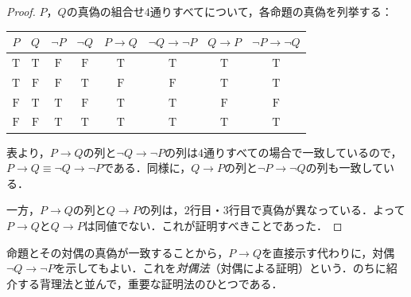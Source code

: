 \begin{tleftbar}
  \begin{proof}
    $P$，$Q$の真偽の組合せ$4$通りすべてについて，各命題の真偽を列挙する：
    \begin{center}
      \begin{tabular}{|c|c||c|c||c|c|c|c|} \hline
        $P$          & $Q$          & $\lnot P$    & $\lnot Q$    & $P \to Q$    & $\lnot Q \to \lnot P$ & $Q \to P$    & $\lnot P \to \lnot Q$ \\ \hline
        $\mathrm{T}$ & $\mathrm{T}$ & $\mathrm{F}$ & $\mathrm{F}$ & $\mathrm{T}$ & $\mathrm{T}$          & $\mathrm{T}$ & $\mathrm{T}$          \\ \hline
        $\mathrm{T}$ & $\mathrm{F}$ & $\mathrm{F}$ & $\mathrm{T}$ & $\mathrm{F}$ & $\mathrm{F}$          & $\mathrm{T}$ & $\mathrm{T}$          \\ \hline
        $\mathrm{F}$ & $\mathrm{T}$ & $\mathrm{T}$ & $\mathrm{F}$ & $\mathrm{T}$ & $\mathrm{T}$          & $\mathrm{F}$ & $\mathrm{F}$          \\ \hline
        $\mathrm{F}$ & $\mathrm{F}$ & $\mathrm{T}$ & $\mathrm{T}$ & $\mathrm{T}$ & $\mathrm{T}$          & $\mathrm{T}$ & $\mathrm{T}$          \\ \hline
      \end{tabular}
    \end{center}
    表より，$P \to Q$の列と$\lnot Q \to \lnot P$の列は$4$通りすべての場合で一致しているので，$P \to Q \equiv \lnot Q \to \lnot P$である．同様に，$Q \to P$の列と$\lnot P \to \lnot Q$の列も一致している．

    一方，$P \to Q$の列と$Q \to P$の列は，$2$行目・$3$行目で真偽が異なっている．よって$P \to Q$と$Q \to P$は同値でない．これが証明すべきことであった．
  \end{proof}
\end{tleftbar}

\begin{remark}[対偶と背理法]
  命題とその対偶の真偽が一致することから，$P \to Q$を直接示す代わりに，対偶$\lnot Q \to \lnot P$を示してもよい．これを\emph{対偶法}（対偶による証明）という．のちに紹介する背理法と並んで，重要な証明法のひとつである．
\end{remark}

